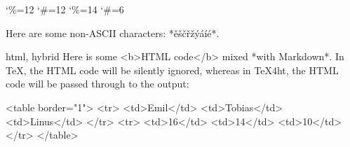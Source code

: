 \documentclass{book}
\begin{document}

\catcode`\%=12\relax
\catcode`\#=12\relax
{}
\catcode`\%=14\relax
\catcode`\#=6\relax

\begin{markdown}
Here are some non-ASCII characters: *ěščřžýáíé*.
\end{markdown}

\begin{markdown*}{html, hybrid}
Here is some <b>HTML code</b> mixed *with Markdown*. In \TeX, the HTML code
will be silently ignored, whereas in \TeX 4ht, the HTML code will be passed
through to the output:

<table border="1">
  <tr>
    <td>Emil</td>
    <td>Tobias</td>
    <td>Linus</td>
  </tr>
  <tr>
    <td>16</td>
    <td>14</td>
    <td>10</td>
  </tr>
</table>
\end{markdown*}
\end{document}
